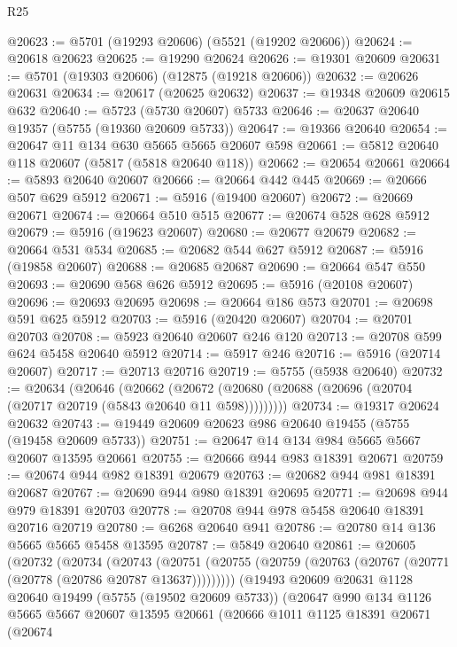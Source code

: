 \begin{lexlean}{R25}
\begin{coremodule}
@20623 := @5701 (@19293 @20606) (@5521 (@19202 @20606))
@20624 := @20618 @20623
@20625 := @19290 @20624
@20626 := @19301 @20609
@20631 := @5701 (@19303 @20606) (@12875 (@19218 @20606))
@20632 := @20626 @20631
@20634 := @20617 (@20625 @20632)
@20637 := @19348 @20609 @20615 @632
@20640 := @5723 (@5730 @20607) @5733
@20646 := @20637 @20640 @19357 (@5755 (@19360 @20609 @5733))
@20647 := @19366 @20640
@20654 := @20647 @11 @134 @630 @5665 @5665 @20607 @598
@20661 := @5812 @20640 @118 @20607 (@5817 (@5818 @20640 @118))
@20662 := @20654 @20661
@20664 := @5893 @20640 @20607
@20666 := @20664 @442 @445
@20669 := @20666 @507 @629 @5912
@20671 := @5916 (@19400 @20607)
@20672 := @20669 @20671
@20674 := @20664 @510 @515
@20677 := @20674 @528 @628 @5912
@20679 := @5916 (@19623 @20607)
@20680 := @20677 @20679
@20682 := @20664 @531 @534
@20685 := @20682 @544 @627 @5912
@20687 := @5916 (@19858 @20607)
@20688 := @20685 @20687
@20690 := @20664 @547 @550
@20693 := @20690 @568 @626 @5912
@20695 := @5916 (@20108 @20607)
@20696 := @20693 @20695
@20698 := @20664 @186 @573
@20701 := @20698 @591 @625 @5912
@20703 := @5916 (@20420 @20607)
@20704 := @20701 @20703
@20708 := @5923 @20640 @20607 @246 @120
@20713 := @20708 @599 @624 @5458 @20640 @5912
@20714 := @5917 @246
@20716 := @5916 (@20714 @20607)
@20717 := @20713 @20716
@20719 := @5755 (@5938 @20640)
@20732 := @20634
    (@20646
      (@20662 (@20672 (@20680 (@20688 (@20696 (@20704 (@20717 @20719 (@5843 @20640 @11 @598)))))))))
@20734 := @19317 @20624 @20632
@20743 := @19449 @20609 @20623 @986 @20640 @19455 (@5755 (@19458 @20609 @5733))
@20751 := @20647 @14 @134 @984 @5665 @5667 @20607 @13595 @20661
@20755 := @20666 @944 @983 @18391 @20671
@20759 := @20674 @944 @982 @18391 @20679
@20763 := @20682 @944 @981 @18391 @20687
@20767 := @20690 @944 @980 @18391 @20695
@20771 := @20698 @944 @979 @18391 @20703
@20778 := @20708 @944 @978 @5458 @20640 @18391 @20716 @20719
@20780 := @6268 @20640 @941
@20786 := @20780 @14 @136 @5665 @5665 @5458 @13595
@20787 := @5849 @20640
@20861 := @20605
    (@20732
      (@20734
        (@20743
          (@20751 (@20755 (@20759 (@20763 (@20767 (@20771 (@20778 (@20786 @20787 @13637)))))))))
        (@19493
          @20609
          @20631
          @1128
          @20640
          @19499
          (@5755 (@19502 @20609 @5733))
          (@20647
            @990
            @134
            @1126
            @5665
            @5667
            @20607
            @13595
            @20661
            (@20666
              @1011
              @1125
              @18391
              @20671
              (@20674

\end{coremodule}
\end{lexlean}
